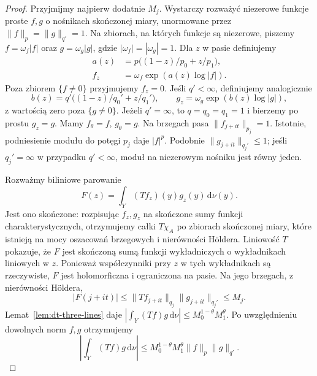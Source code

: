 \begin{proof}
Przyjmijmy najpierw dodatnie $M_j$. Wystarczy rozważyć
niezerowe funkcje proste $f,g$ o nośnikach skończonej
miary, unormowane przez $\|f\|_p=\|g\|_{q'}=1$.
Na zbiorach, na których funkcje są niezerowe, piszemy
$f=\omega_f|f|$ oraz $g=\omega_g|g|$, gdzie
$|\omega_f|=|\omega_g|=1$. Dla $z$ w pasie definiujemy
\[
\begin{aligned}
 a(z)&=p\bigl((1-z)/p_0+z/p_1\bigr),\\
 f_z&=\omega_f\exp(a(z)\log|f|).
\end{aligned}
\]
Poza zbiorem $\{f\ne0\}$ przyjmujemy $f_z=0$.
Jeśli $q'<\infty$, definiujemy analogicznie
\[
 b(z)=q'\bigl((1-z)/q_0'+z/q_1'\bigr),
 \qquad
 g_z=\omega_g\exp(b(z)\log|g|),
\]
z wartością zero poza $\{g\ne0\}$.
Jeżeli $q'=\infty$, to $q=q_0=q_1=1$ i bierzemy
po prostu $g_z=g$.
Mamy $f_\theta=f$, $g_\theta=g$. Na brzegach pasa
$\|f_{j+it}\|_{p_j}=1$. Istotnie, podniesienie
modułu do potęgi $p_j$ daje $|f|^p$.
Podobnie $\|g_{j+it}\|_{q_j'}\le1$; jeśli
$q_j'=\infty$ w przypadku $q'<\infty$, moduł
na niezerowym nośniku jest równy jeden.

Rozważmy biliniowe parowanie
\[
 F(z)=\int_Y (Tf_z)(y)g_z(y)\,\mathrm d\nu(y).
\]
Jest ono skończone: rozpisując $f_z,g_z$ na skończone
sumy funkcji charakterystycznych, otrzymujemy całki
$T\chi_A$ po zbiorach skończonej miary, które istnieją
na mocy oszacowań brzegowych i nierówności Höldera.
Liniowość $T$ pokazuje, że $F$ jest skończoną sumą
funkcji wykładniczych o wykładnikach liniowych w $z$.
Ponieważ współczynniki przy $z$ w tych wykładnikach
są rzeczywiste, $F$ jest holomorficzna i ograniczona
na pasie. Na jego brzegach, z nierówności Höldera,
\[
 |F(j+it)|\le
 \|Tf_{j+it}\|_{q_j}\|g_{j+it}\|_{q_j'}\le M_j.
\]
Lemat~\ref{lem:dt-three-lines} daje
$|\int_Y (Tf)g\,\mathrm d\nu|\le M_0^{1-\theta}M_1^\theta$.
Po uwzględnieniu dowolnych norm $f,g$ otrzymujemy
\[
 \left|\int_Y(Tf)g\,\mathrm d\nu\right|
 \le M_0^{1-\theta}M_1^\theta\|f\|_p\|g\|_{q'}.
\]


\end{proof}
